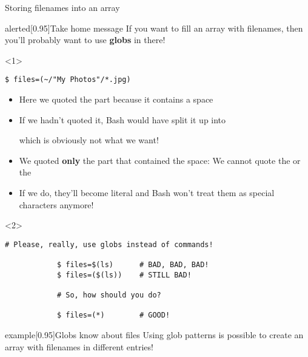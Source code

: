 \begin{frame}[fragile]{Storing filenames into an array}
    \begin{varblock}{alerted}[0.95\textwidth]{Take home message}
        If you want to fill an array with filenames, then you'll probably want to use \alert{\textbf{globs}} in there!
    \end{varblock}
    \medskip
    \begin{onlyenv}<1>
        \begin{lstlisting}[style=MyBash, numbers=none, xleftmargin=30mm, xrightmargin=30mm]
            $ files=(~/"My Photos"/*.jpg)
        \end{lstlisting}
        \medskip
        \begin{itemize}
            \item Here we quoted the  part because it contains a space
            \item If we hadn't quoted it, Bash would have split it up into\\ \centerline{\small{}} which is obviously not what we want!
            \item We quoted \textbf{only} the part that contained the space: We cannot quote the \PB{\texttt{\textasciitilde}} or the \PB{\texttt{*}}
            \item If we do, they'll become literal and Bash won't treat them as special characters anymore!
        \end{itemize}
    \end{onlyenv}
    \begin{onlyenv}<2>
        \begin{lstlisting}[style=MyBash, numbers=none]
            # Please, really, use globs instead of commands!
            
            $ files=$(ls)      # BAD, BAD, BAD!
            $ files=($(ls))    # STILL BAD!
            
            # So, how should you do?
            
            $ files=(*)        # GOOD!
        \end{lstlisting}
        \medskip
        \begin{varblock}{example}[0.95\textwidth]{Globs know about files}
            Using glob patterns is possible to create an array with filenames in different entries!
        \end{varblock}
    \end{onlyenv}
\end{frame}
